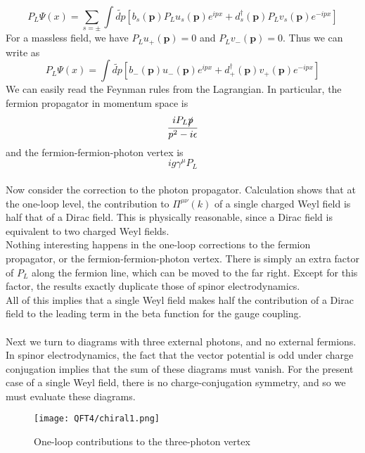\documentclass[cyan]{elegantnote}
\begin{document}
\[P_L\Psi(x) = \sum_{s = \pm} \int \tilde{dp} [b_s(\bm{p})P_Lu_s(\bm{p})e^{ipx} + d_s^{\dagger}(\bm{p})P_L v_s(\bm{p}) e^{-ipx}]\]
For a massless field, we have $P_L u_{+}(\bm{p}) = 0$ and $P_L v_-(\bm{p}) = 0$. Thus we can write as
\[P_L\Psi(x) =  \int \tilde{dp} [b_-(\bm{p})u_-(\bm{p})e^{ipx} + d_+^{\dagger}(\bm{p}) v_+(\bm{p}) e^{-ipx}]\]
We can easily read the Feynman rules from the Lagrangian. In particular, the fermion propagator in momentum space is
\[\frac{iP_L\slashed{p}}{p^2-i\epsilon}\]
and the fermion-fermion-photon vertex is
\[ig\gamma^{\mu} P_L\]
\\
Now consider the correction to the photon propagator. Calculation shows that at the one-loop level, the contribution to $\Pi^{\mu\nu}(k)$ of a single charged Weyl field is half that of a Dirac field. This is physically reasonable, since a Dirac field is equivalent to two charged Weyl fields.
\\
Nothing interesting happens in the one-loop corrections to the fermion propagator, or the fermion-fermion-photon vertex. There is simply an extra factor of $P_L$ along the fermion line, which can be moved to the far right. Except for this factor, the results exactly duplicate those of spinor electrodynamics.
\\
All of this implies that a single Weyl field makes half the contribution of a Dirac field to the leading term in the beta function for the gauge coupling.
\\ \\
Next we turn to diagrams with three external photons, and no external fermions. In spinor electrodynamics, the fact that the vector potential is odd under charge conjugation implies that the sum of these diagrams must vanish. For the present case of a single Weyl field, there is no charge-conjugation symmetry, and so we must evaluate these diagrams.
\begin{figure}[!h]
	\centering
	\texttt{[image: QFT4/chiral1.png]}
	\caption{One-loop contributions to the three-photon vertex}
\end{figure}
\end{document}
